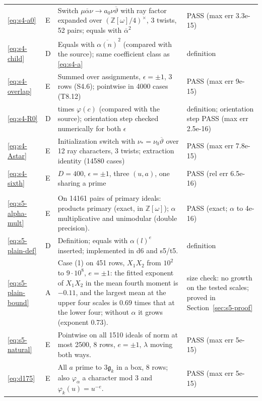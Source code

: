 \documentclass[11pt]{article}
\numberwithin{equation}{section}
\newcommand{\OO}{\mathbb Z[\omega]}
\begin{document}
\begin{longtable}{@{}>{\raggedright\arraybackslash}p{1.2cm}>{\centering\arraybackslash}p{0.7cm}>{\raggedright\arraybackslash}p{9.05cm}>{\raggedright\arraybackslash}p{4.3cm}@{}}
\eqref{eq:s4-a0} & E & Switch $\mu\overline\alpha\nu\to a_0\nu\overline\vartheta$ with ray factor expanded over $(\OO/4)^\times$, 3 twists, 52 pairs; equals \cite{OAI78} with $\overline\alpha^2$ & PASS (max err 3.3e-15)\\
\eqref{eq:s4-child} & D & Equals \cite[eq.~(17.55)]{OAI78} with $\overline{\alpha(n)}^2$ (compared with the source); same coefficient class as \eqref{eq:s4-a} & definition\\
\eqref{eq:s4-overlap} & E & Summed over assignments, $\epsilon=\pm1$, 3 rows (S4.6); pointwise in 4000 cases (T8.12) & PASS (max err 9e-15)\\
\eqref{eq:s4-R0} & D & \cite[eq.~(17.68)]{OAI78} times $\varphi(c)$ (compared with the source); orientation step checked numerically for both $\epsilon$ & definition; orientation step PASS (max err 2.5e-16)\\
\eqref{eq:s4-Astar} & E & Initialization switch with $\nu_*=\nu_0\overline\vartheta$ over 12 ray characters, 3 twists; extraction identity (14580 cases) & PASS (max err 7.8e-15)\\
\eqref{eq:s4-sixth} & E & $D=400$, $\epsilon=\pm1$, three $(u,a)$, one sharing a prime & PASS (rel err 6.5e-16)\\
\multicolumn{4}{@{}l}{\emph{Appendix~F}}\\
\eqref{eq:s5-alpha-mult} & E & On 14161 pairs of primary ideals: products primary (exact, in $\mathbb Z[\omega]$); $\alpha$ multiplicative and unimodular (double precision). & PASS (exact; $\alpha$ to 4e-16)\\
\eqref{eq:s5-plain-def} & D & Definition; equals \cite[eq.~(4.1)]{OAI78} with $\alpha(l)^e$ inserted; implemented in d6 and s5/t5. & definition\\
\eqref{eq:s5-plain-bound} & A & Case (1) on 451 rows, $X_1X_2$ from $10^2$ to $9\cdot10^8$, $e=\pm1$: the fitted exponent of $X_1X_2$ in the mean fourth moment is $-0.11$, and the largest mean at the upper four scales is 0.69 times that at the lower four; without $\alpha$ it grows (exponent 0.73). & size check: no growth on the tested scales; proved in Section~\ref{sec:s5-proof}\\
\eqref{eq:s5-natural} & E & Pointwise on all 1510 ideals of norm at most 2500, 8 rows, $e=\pm1$, $\lambda$ moving both ways. & PASS (max err 5e-15)\\
\eqref{eq:d175} & E & All $a$ prime to $3\mathfrak g_k$ in a box, 8 rows; also $\varphi_\alpha$ a character mod 3 and $\varphi_k(u)=u^{-e}$. & PASS (max err 5e-15)\\

\end{longtable}
\end{document}
